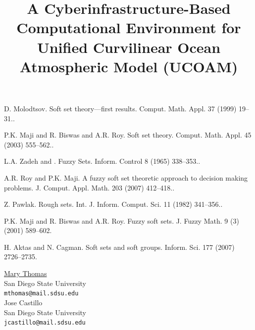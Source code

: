 \documentclass[article, A4, 11pt]{llncs}%
\begin{document}

\begin{thebibliography}{10}
{\sc D. Molodtsov}. {Soft set theory—first results}. Comput. Math. Appl. 37 (1999) 19–31..

{\sc P.K. Maji and R. Biswas and A.R. Roy}. { Soft set theory}. Comput. Math. Appl. 45 (2003) 555–562..

{\sc L.A. Zadeh and  }. {Fuzzy Sets}. Inform. Control 8 (1965) 338–353..

{\sc A.R. Roy and P.K. Maji}. {A fuzzy soft set theoretic approach to decision making problems}. J. Comput. Appl. Math. 203 (2007) 412–418..

{\sc Z. Pawlak}. {Rough sets}. Int. J. Inform. Comput. Sci. 11 (1982) 341–356..

{\sc P.K. Maji and R. Biswas and A.R. Roy}. { Fuzzy soft sets}.  J. Fuzzy Math. 9 (3) (2001) 589–602.

{\sc H. Aktas and N. Cagman}. {Soft sets and soft groups}. Inform. Sci. 177 (2007) 2726–2735.
\end{thebibliography} %

\title{A Cyberinfrastructure-Based Computational Environment for Unified Curvilinear Ocean Atmospheric Model  (UCOAM)}
 \author{} \institute{}
\maketitle
\vspace{-5mm}
\begin{center}
{\large \underline{Mary  Thomas}}\\
San Diego State University\\
{\tt mthomas@mail.sdsu.edu}
\\ \vspace{4mm}
{\large Jose Castillo}\\
San Diego State University\\
{\tt jcastillo@mail.sdsu.edu}
\end{center}
\end{document}
